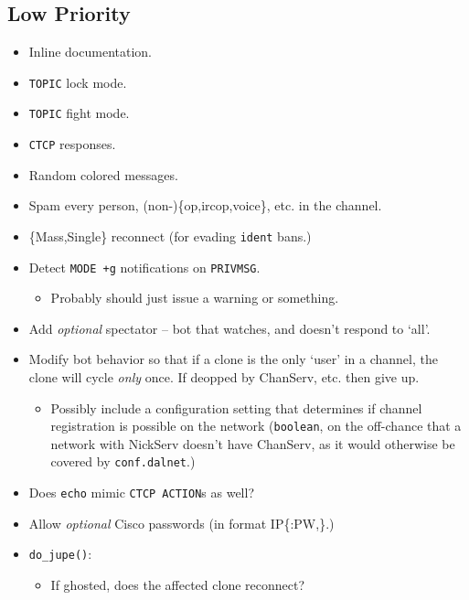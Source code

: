 \documentclass{article}
\begin{document}
\subsection{Low Priority}\label{Low Priority}
\begin{itemize}
\item Inline documentation.
\item {\tt TOPIC} lock mode.
\item {\tt TOPIC} fight mode.
\item {\tt CTCP} responses.
\item Random colored messages.
\item Spam every person, (non-)\{op,ircop,voice\}, etc. in the channel.
\item \{Mass,Single\} reconnect (for evading {\tt ident} bans.)
\item Detect {\tt MODE +g} notifications on {\tt PRIVMSG}.
\begin{itemize}
\item Probably should just issue a warning or something.
\end{itemize}
\item Add \emph{optional} spectator -- bot that watches, and doesn't respond to `all'.
\item Modify bot behavior so that if a clone is the only `user' in a channel, the clone will cycle \emph{only} once. If deopped by ChanServ, etc. then give up.
\begin{itemize}
\item Possibly include a configuration setting that determines if channel registration is possible on the network ({\tt boolean}, on the off-chance that a network with NickServ doesn't have ChanServ, as it would otherwise be covered by {\tt conf.dalnet}.)
\end{itemize}
\item Does {\tt echo} mimic {\tt CTCP ACTION}s as well?
\item Allow \emph{optional} Cisco passwords (in format IP\{:PW,\}.)
\item {\tt do\_jupe()}:
\begin{itemize}
\item If ghosted, does the affected clone reconnect?
\end{itemize}
\end{itemize}
\end{document}

